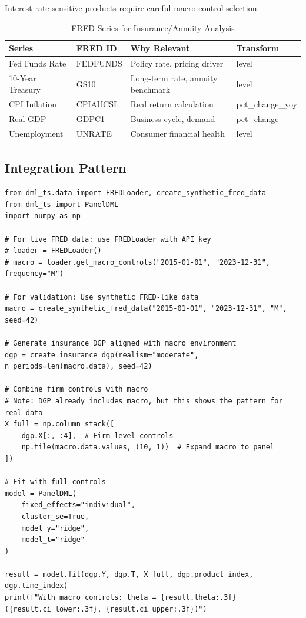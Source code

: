 Interest rate-sensitive products require careful macro control selection:

\begin{table}[htbp]
\centering
\caption{FRED Series for Insurance/Annuity Analysis}
\label{tab:insurance_fred}
\begin{tabular}{llll}
\hline
\textbf{Series} & \textbf{FRED ID} & \textbf{Why Relevant} & \textbf{Transform} \\
\hline
Fed Funds Rate & FEDFUNDS & Policy rate, pricing driver & level \\
10-Year Treasury & GS10 & Long-term rate, annuity benchmark & level \\
CPI Inflation & CPIAUCSL & Real return calculation & pct\_change\_yoy \\
Real GDP & GDPC1 & Business cycle, demand & pct\_change \\
Unemployment & UNRATE & Consumer financial health & level \\
\hline
\end{tabular}
\end{table}

\subsection{Integration Pattern}

\begin{verbatim}
from dml_ts.data import FREDLoader, create_synthetic_fred_data
from dml_ts import PanelDML
import numpy as np

# For live FRED data: use FREDLoader with API key
# loader = FREDLoader()
# macro = loader.get_macro_controls("2015-01-01", "2023-12-31", frequency="M")

# For validation: Use synthetic FRED-like data
macro = create_synthetic_fred_data("2015-01-01", "2023-12-31", "M", seed=42)

# Generate insurance DGP aligned with macro environment
dgp = create_insurance_dgp(realism="moderate", n_periods=len(macro.data), seed=42)

# Combine firm controls with macro
# Note: DGP already includes macro, but this shows the pattern for real data
X_full = np.column_stack([
    dgp.X[:, :4],  # Firm-level controls
    np.tile(macro.data.values, (10, 1))  # Expand macro to panel
])

# Fit with full controls
model = PanelDML(
    fixed_effects="individual",
    cluster_se=True,
    model_y="ridge",
    model_t="ridge"
)

result = model.fit(dgp.Y, dgp.T, X_full, dgp.product_index, dgp.time_index)
print(f"With macro controls: theta = {result.theta:.3f} ({result.ci_lower:.3f}, {result.ci_upper:.3f})")
\end{verbatim}

